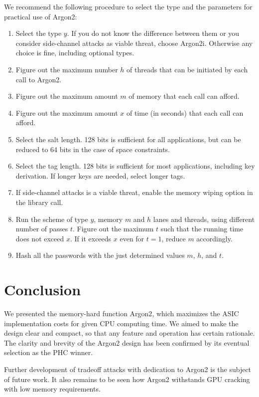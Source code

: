 \documentclass[a4paper]{article}
\begin{document}
We recommend the following procedure to select the type and the parameters for practical use of \textsf{Argon2}:
\begin{enumerate}
\item Select the type $y$. If you do not know the difference between them or you consider side-channel attacks as viable threat, choose \textsf{Argon2i}. Otherwise any choice is fine, including optional types.
\item Figure out the maximum number $h$ of threads that can be initiated by each call to  \textsf{Argon2}. 
\item Figure out the maximum amount $m$ of memory that each call can afford. 
\item Figure out the maximum amount $x$ of time (in seconds) that each call can afford.
\item Select the salt length. 128 bits is sufficient for all applications, but can be reduced to 64 bits in the case of space constraints.
\item Select the tag length. 128 bits is sufficient for most applications, including key derivation. If longer keys are needed, select longer tags.
\item If side-channel attacks is a viable threat, enable the memory wiping option in the library call.
\item Run the scheme of type $y$, memory $m$ and $h$ lanes and threads, using different number of passes $t$. Figure out the maximum $t$ such that the running time does not exceed $x$. If it exceeds $x$ even for $t=1$, reduce $m$ accordingly.
\item Hash all the passwords with the just determined values $m$, $h$, and $t$.
\end{enumerate}


\section{Conclusion}

We presented  the memory-hard function \textsf{Argon2}, which maximizes the ASIC implementation costs for given CPU computing time. We aimed to make the design clear and compact, so that any feature and operation has certain rationale. The clarity and brevity of the Argon2 design has been confirmed by its eventual selection as the PHC winner.

Further development of tradeoff attacks with dedication to \textsf{Argon2} is the subject of future work. It also remains to be seen how \textsf{Argon2} withstands GPU cracking with low memory requirements.
\end{document}
